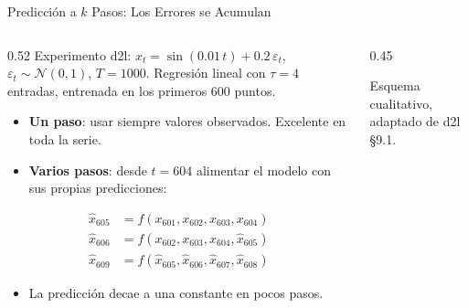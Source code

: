\documentclass[aspectratio=169, 10pt]{beamer}
\begin{document}
\begin{frame}{Predicci\'on a $k$ Pasos: Los Errores se Acumulan}

	\begin{columns}[T]
		\begin{column}{0.52\textwidth}
			\small
			Experimento d2l: $x_t = \sin(0.01\,t) + 0.2\,\varepsilon_t$, $\varepsilon_t\sim\mathcal{N}(0,1)$, $T=1000$. Regresi\'on lineal con $\tau=4$ entradas, entrenada en los primeros 600 puntos.

			\vspace{0.1cm}

			\begin{itemize}
				\item \textbf{Un paso}: usar siempre valores observados. Excelente en toda la serie.
				\item \textbf{Varios pasos}: desde $t=604$ alimentar el modelo con sus propias predicciones:
			\end{itemize}
			\vspace{-0.1cm}
			\[\scriptstyle
				\begin{aligned}
					\hat{x}_{605} & = f(x_{601}, x_{602}, x_{603}, x_{604})                 \\
					\hat{x}_{606} & = f(x_{602}, x_{603}, x_{604}, \hat{x}_{605})           \\
					\hat{x}_{609} & = f(\hat{x}_{605}, \hat{x}_{606}, \hat{x}_{607}, \hat{x}_{608})
				\end{aligned}
			\]
			\vspace{-0.2cm}
			\begin{itemize}
				\item La predicci\'on decae a una constante en pocos pasos.
			\end{itemize}
		\end{column}

		\begin{column}{0.45\textwidth}
			\centering
			{\tiny Esquema cualitativo, adaptado de d2l \S9.1.}


\end{column}
\end{columns}
\end{frame}
\end{document}
